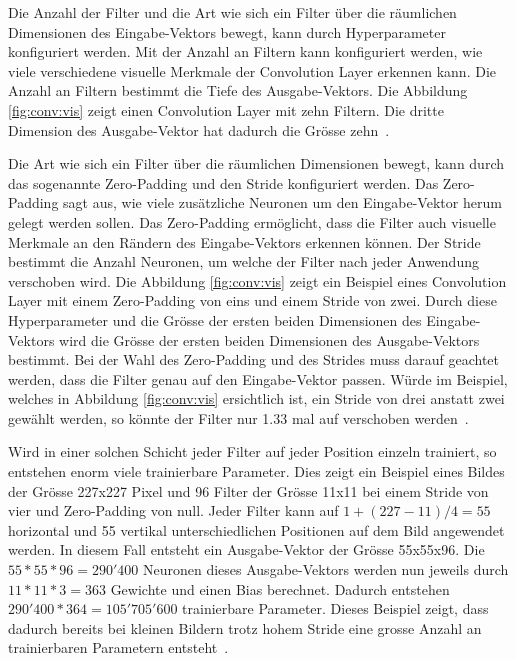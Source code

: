 Die Anzahl der Filter und die Art wie sich ein Filter über die räumlichen Dimensionen des Eingabe-Vektors bewegt, kann durch Hyperparameter konfiguriert werden. Mit der Anzahl an Filtern kann konfiguriert werden, wie viele verschiedene visuelle Merkmale der Convolution Layer erkennen kann. Die Anzahl an Filtern bestimmt die Tiefe des Ausgabe-Vektors. Die Abbildung \ref{fig:conv:vis} zeigt einen Convolution Layer mit zehn Filtern. Die dritte Dimension des Ausgabe-Vektor hat dadurch die Grösse zehn~\autocite{CNN}.

Die Art wie sich ein Filter über die räumlichen Dimensionen bewegt, kann durch das sogenannte Zero-Padding und den Stride konfiguriert werden. Das Zero-Padding sagt aus, wie viele zusätzliche Neuronen um den Eingabe-Vektor herum gelegt werden sollen. Das Zero-Padding ermöglicht, dass die Filter auch visuelle Merkmale an den Rändern des Eingabe-Vektors erkennen können. Der Stride bestimmt die Anzahl Neuronen, um welche der Filter nach jeder Anwendung verschoben wird. Die Abbildung \ref{fig:conv:vis} zeigt ein Beispiel eines Convolution Layer mit einem Zero-Padding von eins und einem Stride von zwei. Durch diese Hyperparameter und die Grösse der ersten beiden Dimensionen des Eingabe-Vektors wird die Grösse der ersten beiden Dimensionen des Ausgabe-Vektors bestimmt. Bei der Wahl des Zero-Padding und des Strides muss darauf geachtet werden, dass die Filter genau auf den Eingabe-Vektor passen. Würde im Beispiel, welches in Abbildung \ref{fig:conv:vis} ersichtlich ist, ein Stride von drei anstatt zwei gewählt werden, so könnte der Filter nur 1.33 mal auf verschoben werden~\autocite{CNN}.

Wird in einer solchen Schicht jeder Filter auf jeder Position einzeln trainiert, so entstehen enorm viele trainierbare Parameter. Dies zeigt ein Beispiel eines Bildes der Grösse 227x227 Pixel und 96 Filter der Grösse 11x11 bei einem Stride von vier und Zero-Padding von null. Jeder Filter kann auf $1+(227-11)/4 = 55$ horizontal und 55 vertikal unterschiedlichen Positionen auf dem Bild angewendet werden. In diesem Fall entsteht ein Ausgabe-Vektor der Grösse 55x55x96. Die $55*55*96 = 290'400$ Neuronen dieses Ausgabe-Vektors werden nun jeweils durch $11*11*3 = 363$ Gewichte und einen Bias berechnet. Dadurch entstehen $290'400*364 = 105'705'600$ trainierbare Parameter. Dieses Beispiel zeigt, dass dadurch bereits bei kleinen Bildern trotz hohem Stride eine grosse Anzahl an trainierbaren Parametern entsteht~\autocite{CNN}.

